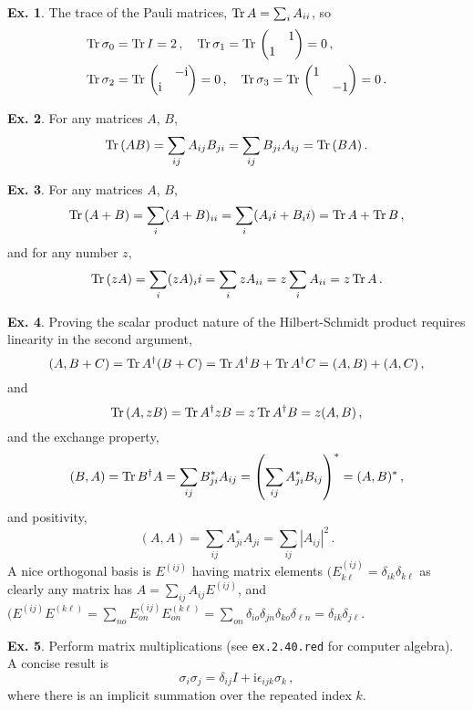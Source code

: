 \documentclass[a4paper,12pt]{article}
\def\imagi{\mathrm{i}}
\def\Tr{\ensuremath{\mathop{\rm Tr}}{}}
\theoremstyle{definition}
\newtheorem{exercise}{Ex.}[section]
\begin{document}
\begin{exercise}
 The trace of the Pauli matrices, $\Tr A = \sum_i A_{ii}$, so
 \[\begin{aligned}
  \Tr \sigma_0 &= \Tr I = 2\,,\quad
  \Tr\sigma_1 = \Tr \begin{pmatrix}  & 1 \\ 1 &  \end{pmatrix} = 0\,,\\
  \Tr \sigma_2 &= \Tr \begin{pmatrix}  & -\imagi \\ \imagi & \end{pmatrix} =0\,,\quad
  \Tr \sigma_3 = \Tr \begin{pmatrix} 1 & \\ & -1\end{pmatrix}=0\,.
 \end{aligned}\]
\end{exercise}

\begin{exercise}
 For any matrices $A$, $B$,
 \[
  \Tr (AB) = \sum_{ij}A_{ij}B_{ji} = \sum_{ij}B_{ji}A_{ij}=\Tr(BA)\,.
 \]
\end{exercise}

\begin{exercise}
 For any matrices $A$, $B$,
 \[
  \Tr(A+B) = \sum_{i}(A+B)_{ii} = \sum_i (A_ii+B_ii) = \Tr A + \Tr B\,,
 \]
 and for any number $z$,
 \[
  \Tr (zA) = \sum_i (zA)_ii=\sum_i zA_{ii} = z\sum_i A_{ii}=z\Tr A\,.
 \]
\end{exercise}

\begin{exercise}
 Proving the scalar product nature of the Hilbert-Schmidt product requires linearity in the second argument,
 \[
  (A, B+C) = \Tr A^\dagger(B+C) = \Tr A^\dagger B + \Tr A^\dagger C=(A, B)+(A, C)\,,
 \]
 and
 \[
  \Tr(A, zB) = \Tr A^\dagger z B = z\Tr A^\dagger B=z(A, B)\,,
 \]
 and the exchange property,
 \[
  (B, A) = \Tr B^\dagger A = \sum_{ij}B^*_{ji}A_{ij} = \left(\sum_{ij}A_{ji}^*B_{ij}\right)^* = (A, B)^*\,,
 \]
 and positivity,
 \[
  (A, A) = \sum_{ij}A_{ji}^* A_{ji} = \sum_{ij}|A_{ij}|^2\,.
 \]
 A nice orthogonal basis is $E^{(ij)}$ having matrix elements $(E^{(ij)}_{k\ell} = \delta_{ik}\delta_{k\ell}$ as clearly any matrix has $A=\sum_{ij}A_{ij}E^{(ij)}$, and $(E^{(ij)}E^{(k\ell)} = \sum_{no}E^{(ij)}_{on}E^{(k\ell)}_{on} = \sum_{on}\delta_{io}\delta_{jn}\delta_{ko}\delta_{\ell n}=\delta_{ik}\delta_{j\ell}$.
\end{exercise}

\begin{exercise}
 Perform matrix multiplications (see {\tt ex.2.40.red} for computer algebra). A concise result is
 \[
  \sigma_i \sigma_j = \delta_{ij}I + \imagi \epsilon_{ijk}\sigma_k\,,
 \]
 where there is an implicit summation over the repeated index $k$.
\end{exercise}
\end{document}
